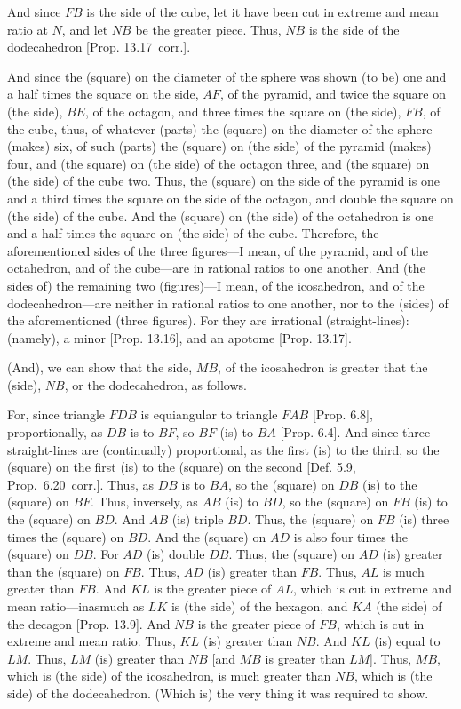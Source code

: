 \begin{Parallel}{}{}
{And since $FB$ is the side of the cube, let it have been cut in extreme and
mean ratio at $N$, and let $NB$ be the greater piece. Thus, $NB$
is the side of the dodecahedron [Prop. 13.17~corr.].

And since the (square) on the diameter of the sphere was shown (to be)
one and a half times the square on the side, $AF$,  of the pyramid,
and twice the square on (the side), $BE$,  of the octagon, and
three times the square on (the side), $FB$, of the cube, 
thus, of whatever (parts) the (square) on the diameter of the
sphere (makes) six, of such (parts) the (square) on (the side) of the pyramid (makes)
four, and (the square) on (the side) of the octagon three, and (the
square) on (the side) of the cube  two. Thus, the (square) on the
side of the pyramid is one and a third times the square on the side of the
octagon, and double the square on (the side) of the cube. 
And the (square) on (the side) of the octahedron is one and a half
times the square on (the side) of the cube. Therefore, the aforementioned
sides of the three figures---I mean, of the pyramid, and of the octahedron, and 
of the cube---are
in rational ratios to one another. And (the sides of) the remaining two (figures)---I mean, of
the icosahedron, and of the dodecahedron---are neither in rational ratios to
one another, nor to the (sides) of the aforementioned (three figures). For they are
irrational (straight-lines): (namely), a minor [Prop. 13.16], and 
an apotome [Prop. 13.17].

(And), we can show that the side, $MB$, of the icosahedron is greater
that the (side), $NB$, or the dodecahedron, as follows.

For, since triangle $FDB$ is equiangular to triangle $FAB$ [Prop. 6.8],
proportionally, as $DB$ is to $BF$, so $BF$ (is) to $BA$ [Prop. 6.4]. 
And since three straight-lines are (continually) proportional, as the
first (is) to the third, so the (square) on the first (is) to the (square) on the
second [Def. 5.9, Prop.~6.20~corr.]. Thus, as $DB$ is to $BA$, so the (square) on $DB$
(is) to the (square) on $BF$. Thus, inversely, as $AB$ (is) to $BD$, so the
(square) on $FB$ (is) to the (square) on $BD$. And $AB$ (is) triple
$BD$. Thus, the (square) on $FB$ (is) three times the (square)
on $BD$. And the (square) on $AD$ is also four times the (square)
on $DB$. For $AD$ (is) double $DB$. Thus, the (square) on $AD$
(is) greater than the (square) on $FB$.  Thus, $AD$ (is) greater than
$FB$. 
Thus, $AL$ is much greater than $FB$. And $KL$ is the greater piece of $AL$, which is cut in extreme and
mean ratio---inasmuch as $LK$ is (the side) of the hexagon, and $KA$
(the side) of the decagon [Prop. 13.9]. And $NB$
is the greater piece of $FB$, which is cut in extreme and mean ratio. 
Thus, $KL$ (is) greater than $NB$.  And $KL$ (is) equal to $LM$. 
Thus, $LM$ (is) greater than $NB$ [and $MB$ is greater than $LM$].
Thus, $MB$, which is (the side) of the icosahedron, is much greater
than $NB$, which is (the side) of the dodecahedron.  (Which is)
the very thing it was required to show.}
\end{Parallel}


